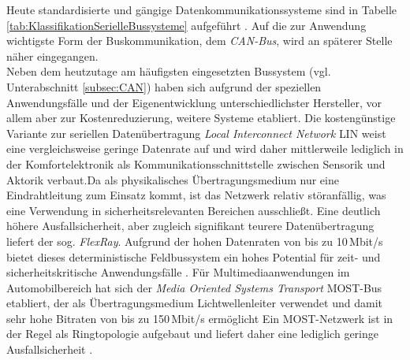 Heute standardisierte und gängige Datenkommunikationssysteme sind in Tabelle \ref{tab:KlassifikationSerielleBussysteme} aufgeführt \cite{VectorInformatikGmbH.b}. Auf die zur Anwendung wichtigste Form der Buskommunikation, dem \emph{\acs{CAN}-Bus}, wird an späterer Stelle näher eingegangen. \\
Neben dem heutzutage am häufigsten eingesetzten Bussystem (vgl. Unterabschnitt \ref{subsec:CAN}) haben sich aufgrund der speziellen Anwendungsfälle und der Eigenentwicklung unterschiedlichster Hersteller, vor allem aber zur Kostenreduzierung, weitere Systeme etabliert. Die kostengünstige Variante zur seriellen Datenübertragung \emph{Local Interconnect Network} \acs{LIN} weist eine vergleichsweise geringe Datenrate auf und wird daher mittlerweile lediglich in der Komfortelektronik als Kommunikationsschnittstelle zwischen Sensorik und Aktorik verbaut.Da als physikalisches Übertragungsmedium nur eine Eindrahtleitung zum Einsatz kommt, ist das Netzwerk relativ störanfällig, was eine Verwendung in sicherheitsrelevanten Bereichen ausschließt. Eine deutlich höhere Ausfallsicherheit, aber zugleich signifikant teurere Datenübertragung liefert der sog. \emph{FlexRay}. Aufgrund der hohen Datenraten von bis zu 10\,Mbit/s bietet dieses deterministische Feldbussystem ein hohes Potential für zeit- und sicherheitskritische Anwendungsfälle \cite{VectorInformatikGmbH.c}. Für Multimediaanwendungen im Automobilbereich hat sich der \emph{Media Oriented Systems Transport} \acs{MOST}-Bus etabliert, der als Übertragungsmedium Lichtwellenleiter verwendet und damit sehr hohe Bitraten von bis zu 150\,Mbit/s ermöglicht Ein MOST-Netzwerk ist in der Regel als Ringtopologie aufgebaut und liefert daher eine lediglich geringe Ausfallsicherheit \cite{Schuller.20.01.2005}.


